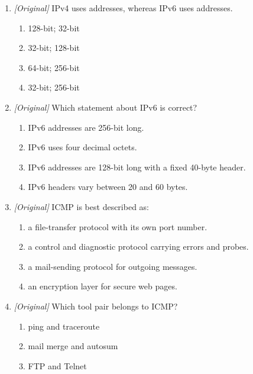 \begin{enumerate}[label=\textbf{Q\arabic*.}, leftmargin=*]
\begin{enumerate}[label=\Alph*.]
    \item It offers best-effort delivery without retransmission.
    \item It guarantees ordered delivery of all datagrams.
    \item It is preferred for streaming and DNS queries.
  \end{enumerate}
\item \textit{[Original]} IPv4 uses \underline{\hspace{2.2cm}} addresses,
  whereas IPv6 uses \underline{\hspace{2.2cm}} addresses.
  \begin{enumerate}[label=\Alph*.]
    \item 128-bit; 32-bit
    \item 32-bit; 128-bit
    \item 64-bit; 256-bit
    \item 32-bit; 256-bit
  \end{enumerate}
\item \textit{[Original]} Which statement about IPv6 is correct?
  \begin{enumerate}[label=\Alph*.]
    \item IPv6 addresses are 256-bit long.
    \item IPv6 uses four decimal octets.
    \item IPv6 addresses are 128-bit long with a fixed 40-byte header.
    \item IPv6 headers vary between 20 and 60 bytes.
  \end{enumerate}
\item \textit{[Original]} ICMP is best described as:
  \begin{enumerate}[label=\Alph*.]
    \item a file-transfer protocol with its own port number.
    \item a control and diagnostic protocol carrying errors and probes.
    \item a mail-sending protocol for outgoing messages.
    \item an encryption layer for secure web pages.
  \end{enumerate}
\item \textit{[Original]} Which tool pair belongs to ICMP?
  \begin{enumerate}[label=\Alph*.]
    \item ping and traceroute
    \item mail merge and autosum
    \item FTP and Telnet

\end{enumerate}
\end{enumerate}
